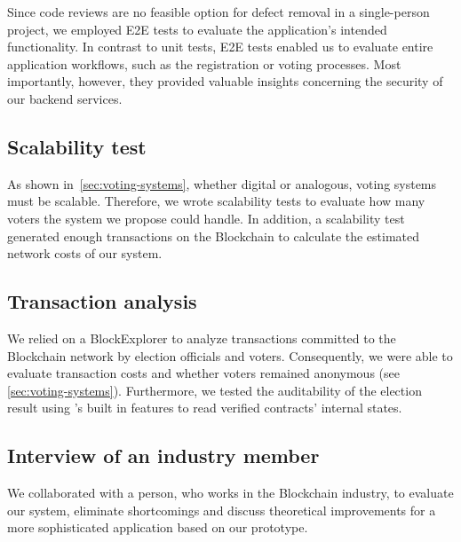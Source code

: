 Since code reviews are no feasible option for defect removal in a single-person project, we employed \gls{E2E} tests to evaluate the application’s intended functionality.
In contrast to unit tests, \gls{E2E} tests enabled us to evaluate entire application workflows, such as the registration or voting processes.
Most importantly, however, they provided valuable insights concerning the security of our backend services.

\subsection{Scalability test}\label{subsec:scalability-test}

As shown in~\cref{sec:voting-systems}, whether digital or analogous, voting systems must be scalable.
Therefore, we wrote scalability tests to evaluate how many voters the system we propose could handle.
In addition, a scalability test generated enough transactions on the \gls{Blockchain} to calculate the estimated network costs of our system.

\subsection{Transaction analysis}\label{subsec:transaction-analysis}

We relied on a \gls{BlockExplorer} to analyze transactions committed to the \gls{Blockchain} network by election officials and voters.
Consequently, we were able to evaluate transaction costs and whether voters remained anonymous (see \cref{sec:voting-systems}).
Furthermore, we tested the auditability of the election result using 's built in features to read verified contracts' internal states.

\subsection{Interview of an industry member}\label{subsec:interview-of-industry-member}

We collaborated with a person, who works in the \gls{Blockchain} industry, to evaluate our system, eliminate shortcomings and discuss theoretical improvements for a more sophisticated application based on our prototype.
